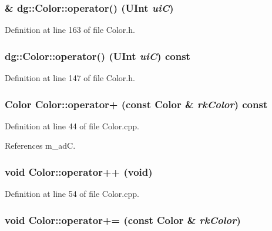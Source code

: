 \subsubsection{ \& dg::Color::operator() ({\bf UInt} {\em ui\-C})\hspace{0.3cm}{\tt  [inline]}}\label{classdg_1_1Color_a13}




Definition at line 163 of file Color.h.
\subsubsection{ dg::Color::operator() ({\bf UInt} {\em ui\-C}) const\hspace{0.3cm}{\tt  [inline]}}\label{classdg_1_1Color_a11}




Definition at line 147 of file Color.h.
\subsubsection{\setlength{\rightskip}{0pt plus 5cm}Color Color::operator+ (const Color \& {\em rk\-Color}) const}\label{classdg_1_1Color_a28}




Definition at line 44 of file Color.cpp.

References m\_\-ad\-C.
\subsubsection{\setlength{\rightskip}{0pt plus 5cm}void Color::operator++ (void)}\label{classdg_1_1Color_a29}




Definition at line 54 of file Color.cpp.
\subsubsection{\setlength{\rightskip}{0pt plus 5cm}void Color::operator+= (const Color \& {\em rk\-Color})}\label{classdg_1_1Color_a30}




